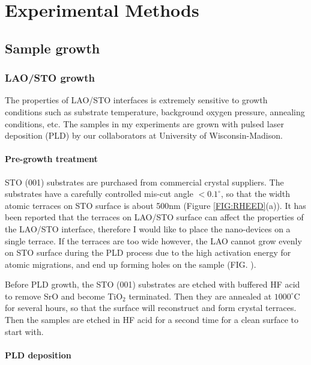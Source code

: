 \documentclass[pdflatex, sectionletters, 12pt]{pittetd}    %
\begin{document}
\chapter{Experimental Methods}

\section{Sample growth}

\subsection{LAO/STO growth}
The properties of LAO/STO interfaces is extremely sensitive to growth conditions such as substrate temperature, background oxygen pressure, annealing conditions, etc\cite{}. The samples in my experiments are grown with pulsed laser deposition (PLD) by our collaborators at University of Wisconsin-Madison.

\subsubsection{Pre-growth treatment}

STO (001) substrates are purchased from commercial crystal suppliers. The substrates have a carefully controlled mis-cut angle $< 0.1^{\circ}$, so that the width atomic terraces on STO surface is about 500nm (Figure \ref{FIG:RHEED}(a)). It has been reported that the terraces on LAO/STO surface can affect the properties of the LAO/STO interface\cite{}, therefore I would like to place the nano-devices on a single terrace. If the terraces are too wide however, the LAO cannot grow evenly on STO surface during the PLD process due to the high activation energy for atomic migrations, and end up forming holes on the sample (FIG. \cite{}). 

Before PLD growth, the STO (001) substrates are etched with buffered HF acid to remove SrO and become TiO$_2$ terminated. Then they are annealed at $1000^{\circ}$C for several hours, so that the surface will reconstruct and form crystal terraces\cite{}. Then the samples are etched in HF acid for a second time for a clean surface to start with. 

\subsubsection{PLD deposition}
\end{document}
